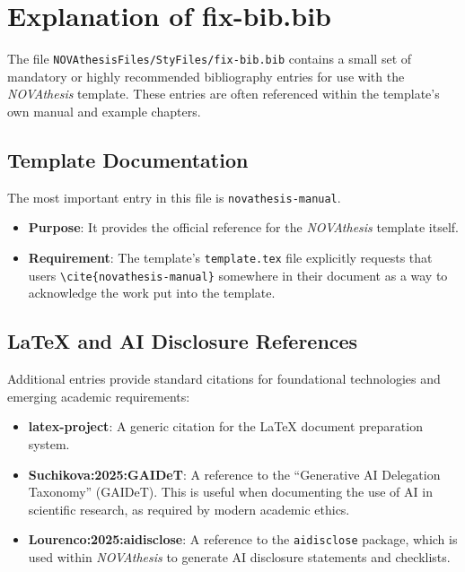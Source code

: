 

\chapter{Explanation of fix-bib.bib}
\label{annex:fix-bib}

The file \texttt{NOVAthesisFiles/StyFiles/fix-bib.bib} contains a small set of mandatory or highly recommended bibliography entries for use with the \emph{NOVAthesis} template. These entries are often referenced within the template's own manual and example chapters.

\section{Template Documentation}
The most important entry in this file is \texttt{novathesis-manual}.
\begin{itemize}
    \item \textbf{Purpose}: It provides the official reference for the \emph{NOVAthesis} template itself.
    \item \textbf{Requirement}: The template's \texttt{template.tex} file explicitly requests that users \texttt{\textbackslash cite\{novathesis-manual\}} somewhere in their document as a way to acknowledge the work put into the template.
\end{itemize}

\section{\LaTeX{} and AI Disclosure References}
Additional entries provide standard citations for foundational technologies and emerging academic requirements:
\begin{itemize}
    \item \textbf{latex-project}: A generic citation for the \LaTeX{} document preparation system.
    \item \textbf{Suchikova:2025:GAIDeT}: A reference to the ``Generative AI Delegation Taxonomy'' (GAIDeT). This is useful when documenting the use of AI in scientific research, as required by modern academic ethics.
    \item \textbf{Lourenco:2025:aidisclose}: A reference to the \texttt{aidisclose} package, which is used within \emph{NOVAthesis} to generate AI disclosure statements and checklists.
\end{itemize}

